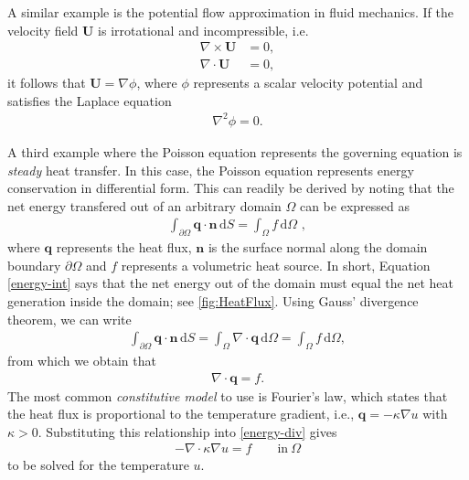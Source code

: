 A similar example is the potential flow approximation in fluid mechanics. If the
velocity field $\bm U$ is irrotational and incompressible, i.e.
\begin{align}
  \nabla \times {\bm U} &= 0, \\
  \nabla \cdot  {\bm U} &= 0,
\end{align}
it follows that ${\bm U}= \nabla \phi$, where $\phi$ represents a scalar
velocity potential and satisfies the Laplace equation
\begin{align}
  \nabla^2 \phi = 0.
\end{align}

A third example where the Poisson equation represents the governing equation is
{\em steady} heat transfer. In this case, the Poisson equation represents energy
conservation in differential form. This can readily be derived by noting that
the net energy transfered out of an arbitrary domain $\Omega$ can be expressed
as
\begin{align}
  \label{energy-int}
  \int_{\partial\Omega} {\bm q}\cdot {\bm n}\, \mathrm{d}S =
  \int_{\Omega}f\, \mathrm{d}\Omega \,\, ,
\end{align}
where $\mathbf{q}$ represents the heat flux, $\mathbf{n}$ is the surface normal
along the domain boundary $\partial\Omega$ and $f$ represents a volumetric heat
source. In short, Equation \eqref{energy-int} says that the net energy out of
the domain must equal the net heat generation inside the domain; see
\autoref{fig:HeatFlux}. Using Gauss' divergence theorem, we can write
\begin{align}
  \int_{\partial\Omega} {\bm q}\cdot {\bm n}\, \mathrm{d}S =
  \int_{\Omega} \nabla \cdot {\bm q}\, \mathrm{d}\Omega = \int_{\Omega}f\,
  \mathrm{d}\Omega,
\end{align}
from which we obtain that
\begin{align}
  \label{energy-div}
  \nabla \cdot {\bm q} = f.
\end{align}
The most common {\em constitutive model} to use is Fourier's law, which states
that the heat flux is proportional to the temperature gradient, i.e., ${\bm q} =
- \kappa \nabla u$ with $\kappa > 0$. Substituting this relationship
into \eqref{energy-div} gives
\begin{align}
  - \nabla\cdot\kappa\nabla u = f \qquad \text{in} \  \Omega
\end{align}
to be solved for the temperature $u$.

